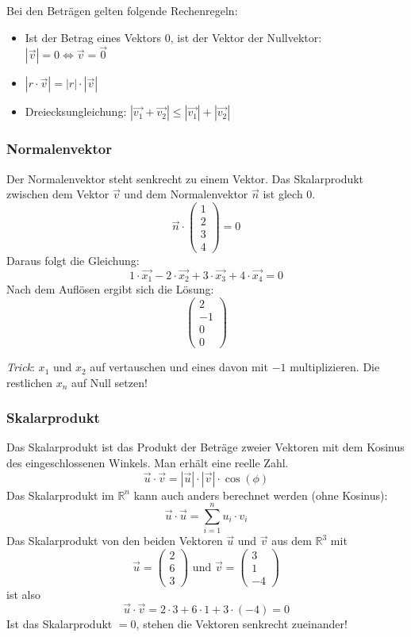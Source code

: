 Bei den Beträgen gelten folgende Rechenregeln:
\begin{itemize}
  \item Ist der Betrag eines Vektors $0$, ist der Vektor der Nullvektor:
    $|\vec{v}| = 0 \Leftrightarrow \vec{v} = \vec{0}$
  \item $|r \cdot \vec{v}| = |r| \cdot |\vec{v}|$
  \item Dreiecksungleichung: $|\vec{v_1} + \vec{v_2}| \le 
    |\vec{v_1}| + |\vec{v_2}|$
\end{itemize}

\subsubsection{Normalenvektor}
Der Normalenvektor steht senkrecht zu einem Vektor. Das Skalarprodukt
zwischen dem Vektor $\vec{v}$ und dem Normalenvektor $\vec{n}$ ist glech 0.
\[ \vec{n} \cdot \begin {pmatrix} 1 \\ 2 \\ 3 \\ 4 \end {pmatrix} = 0 \]
Daraus folgt die Gleichung:
\[ 1 \cdot \vec{x_1} - 2 \cdot \vec{x_2} + 3 \cdot \vec{x_3} + 4 \cdot
\vec{x_4} = 0 \]
Nach dem Auflösen ergibt sich die Lösung:
\[ \begin{pmatrix} 2 \\ -1 \\ 0 \\ 0 \end {pmatrix}\]

\emph{Trick}: $x_1$ und $x_2$ auf vertauschen und eines davon mit $-1$
multiplizieren. Die restlichen $x_n$ auf Null setzen!

\subsubsection{Skalarprodukt}
Das Skalarprodukt ist das Produkt der Beträge zweier Vektoren mit dem
Kosinus des eingeschlossenen Winkels. Man erhält eine reelle Zahl.
\[ \vec{u} \cdot \vec{v} = |\vec{u}| \cdot |\vec{v}| \cdot \cos{(\phi)} \]
Das Skalarprodukt im $\mathbb{R}^n$ kann auch anders berechnet werden
(ohne Kosinus):
\[ \vec{u} \cdot \vec{u} = \sum \limits_{i = 1}^n u_i \cdot v_i \]
Das Skalarprodukt von den beiden Vektoren $\vec{u}$ und
$\vec{v}$ aus dem $\mathbb{R}^3$ mit
\[ \vec{u} = \left( \begin{array}{c} 2 \\ 6 \\ 3 \end{array}\right)
\text{ und } \vec{v} = \left( \begin{array}{c} 3 \\ 1 \\ -4 \end{array}\right) \]
ist also
\[ \vec{u} \cdot \vec{v} = 2 \cdot 3 + 6 \cdot 1 + 3 \cdot (-4) = 0 \]
Ist das Skalarprodukt $= 0$, stehen die Vektoren senkrecht zueinander!

